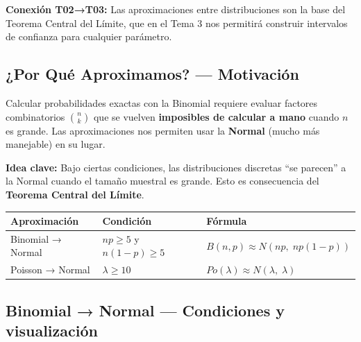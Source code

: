 \documentclass[
  letterpaper,
  DIV=11,
  numbers=noendperiod]{scrartcl}
\newcounter{none} %
\begin{document}
\textbf{Conexión T02→T03:} Las aproximaciones entre distribuciones son
la base del Teorema Central del Límite, que en el Tema 3 nos permitirá
construir intervalos de confianza para cualquier parámetro.

\subsection{¿Por Qué Aproximamos? ---
Motivación}\label{por-que-aproximamos-motivacion}

Calcular probabilidades exactas con la Binomial requiere evaluar
factores combinatorios \(\binom{n}{k}\) que se vuelven
\textbf{imposibles de calcular a mano} cuando \(n\) es grande. Las
aproximaciones nos permiten usar la \textbf{Normal} (mucho más
manejable) en su lugar.

\textbf{Idea clave:} Bajo ciertas condiciones, las distribuciones
discretas ``se parecen'' a la Normal cuando el tamaño muestral es
grande. Esto es consecuencia del \textbf{Teorema Central del Límite}.

{\def\LTcaptype{none} %
\begin{longtable}[]{@{}
  >{\raggedright\arraybackslash}p{}
  >{\raggedright\arraybackslash}p{}
  >{\raggedright\arraybackslash}p{}@{}}
\toprule\noalign{}
\begin{minipage}[b]{\linewidth}\raggedright
Aproximación
\end{minipage} & \begin{minipage}[b]{\linewidth}\raggedright
Condición
\end{minipage} & \begin{minipage}[b]{\linewidth}\raggedright
Fórmula
\end{minipage} \\
\midrule\noalign{}
\endhead
\bottomrule\noalign{}
\endlastfoot
Binomial → Normal & \(np \geq 5\) y \(n(1-p) \geq 5\) &
\(B(n,p) \approx N(np,\; np(1-p))\) \\
Poisson → Normal & \(\lambda \geq 10\) &
\(Po(\lambda) \approx N(\lambda,\; \lambda)\) \\
\end{longtable}
}

\subsection{Binomial → Normal --- Condiciones y
visualización}\label{binomial-normal-condiciones-y-visualizacion}
\end{document}
